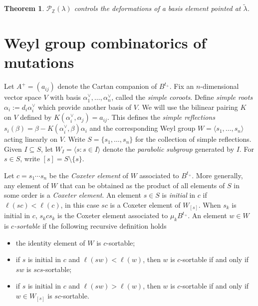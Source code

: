\documentclass{amsart}
\newtheorem{theorem}{Theorem}
\numberwithin{theorem}{section}
\newcommand{\cP}{\mathcal{P}}
\newcommand{\ZZ}{\mathbb{Z}}
\begin{document}
  \begin{theorem}
    \cite{qin}
    $\cP_\ZZ(\lambda)$ controls the deformations of a basis element pointed at $\tilde\lambda$.
  \end{theorem}


  \section{Weyl group combinatorics of mutations}
  Let $A^+=(a_{ij})$ denote the Cartan companion of $B^{t_+}$.
  Fix an $n$-dimensional vector space $V$ with basis $\alpha^\vee_1,\ldots,\alpha^\vee_n$, called the \emph{simple coroots}.
  Define \emph{simple roots} $\alpha_i:=d_i\alpha^\vee_i$ which provide another basis of $V$.
  We will use the bilinear pairing $K$ on $V$ defined by $K(\alpha^\vee_i,\alpha_j)=a_{ij}$.
  This defines the \emph{simple reflections} $s_i(\beta)=\beta-K(\alpha^\vee_i,\beta)\alpha_i$ and the corresponding Weyl group $W=\langle s_1,\ldots,s_n\rangle$ acting linearly on $V$.
  Write $S=\{s_1,\ldots,s_n\}$ for the collection of simple reflections.
  Given $I\subseteq S$, let $W_I=\langle s:s\in I\rangle$ denote the \emph{parabolic subgroup} generated by $I$.
  For $s\in S$, write $[s]=S\setminus\{s\}$.

  Let $c=s_1\cdots s_n$ be the \emph{Coxeter element} of $W$ associated to $B^{t_+}$.
  More generally, any element of $W$ that can be obtained as the product of all elements of $S$ in some order is a \emph{Coxeter element}.
  An element $s\in S$ is \emph{initial} in $c$ if $\ell(sc)<\ell(c)$, in this case $sc$ is a Coxeter element of $W_{[s]}$.
  When $s_k$ is initial in $c$, $s_k c s_k$ is the Coxeter element associated to $\mu_k B^{t_+}$.
  An element $w\in W$ is \emph{$c$-sortable} if the following recursive definition holds
  \begin{itemize}
    \item the identity element of $W$ is $c$-sortable;
    \item if $s$ is initial in $c$ and $\ell(sw)<\ell(w)$, then $w$ is $c$-sortable if and only if $sw$ is $scs$-sortable;
    \item if $s$ is initial in $c$ and $\ell(sw)>\ell(w)$, then $w$ is $c$-sortable if and only if $w\in W_{[s]}$ is $sc$-sortable.
  \end{itemize}


  
  
\end{document}
